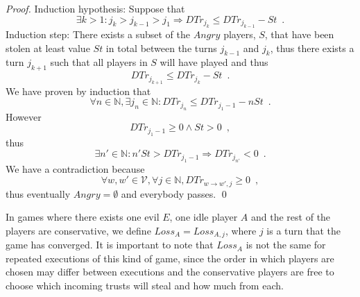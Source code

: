 \documentclass[11pt]{llncs}
\begin{document}
\begin{proof}
       Induction hypothesis: Suppose that
       \begin{equation}
          \exists k > 1 : j_k > j_{k-1} > j_1 \Rightarrow DTr_{j_k} \leq DTr_{j_{k-1}} - St \enspace.
       \end{equation}
       Induction step: There exists a subset of the $Angry$ players, $S$, that have been stolen at least value $St$ in total
       between the turns $j_{k-1}$ and $j_k$, thus there exists a turn $j_{k+1}$ such that all players in $S$ will have
       played and thus
       \begin{equation}
          DTr_{j_{k+1}} \leq DTr_{j_k} - St \enspace.
       \end{equation}
       We have proven by induction that
       \begin{equation}
          \forall n \in \mathbb{N}, \exists j_n \in \mathbb{N} : DTr_{j_n} \leq DTr_{j_1-1} - nSt \enspace.
       \end{equation}
       However
       \begin{equation}
          DTr_{j_1-1} \geq 0 \wedge St > 0 \enspace,
       \end{equation}
       thus
       \begin{equation}
          \exists n' \in \mathbb{N} : n'St > DTr_{j_1-1} \Rightarrow DTr_{j_{n'}} < 0 \enspace.
       \end{equation}
       We have a contradiction because
       \begin{equation}
          \forall w,w' \in \mathcal{V}, \forall j \in \mathbb{N}, DTr_{w \rightarrow w', j} \geq 0 \enspace,
       \end{equation}
       thus eventually $Angry = \emptyset$ and everybody passes. \qed
    \end{proof}
    In games where there exists one evil $E$, one idle player $A$ and the rest of the players are conservative, we define
    $Loss_A = Loss_{A, j}$, where $j$ is a turn that the game has converged. It is important to note that $Loss_A$ is not
    the same for repeated executions of this kind of game, since the order in which players are chosen may differ between
    executions and the conservative players are free to choose which incoming trusts will steal and how much from each.
\end{document}
